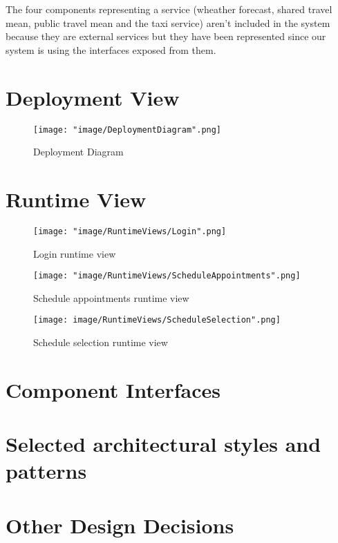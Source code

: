 The four components representing a service (wheather forecast, shared travel mean, public travel mean and the taxi service) aren't included in the system because they are external services but they have been represented since our system is using the interfaces exposed from them.

\section{Deployment View}

\begin{figure}[H]
\begin{center}
\texttt{[image: "image/DeploymentDiagram".png]}
\caption{Deployment Diagram}
\end{center}
\end{figure}

\section{Runtime View}

\begin{figure}[H]
\begin{center}
\texttt{[image: "image/RuntimeViews/Login".png]}
\caption{Login runtime view}
\end{center}
\end{figure}

\begin{figure}[H]
\begin{center}
\texttt{[image: "image/RuntimeViews/ScheduleAppointments".png]}
\caption{Schedule appointments runtime view}
\end{center}
\end{figure}

\begin{figure}[H]
\begin{center}
\texttt{[image: image/RuntimeViews/ScheduleSelection".png]}
\caption{Schedule selection runtime view }
\end{center}
\end{figure}

\section{Component Interfaces}

\section{Selected architectural styles and patterns}

\section{Other Design Decisions}